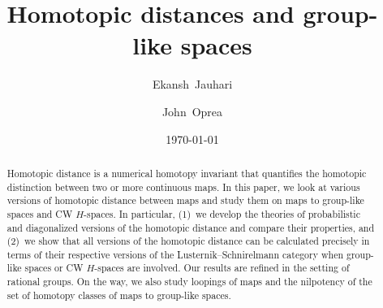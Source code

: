 \documentclass[amscd,amssymb,verbatim,10pt]{amsart}
\date{\today}
\numberwithin{equation}{section}
\theoremstyle{plain}
\theoremstyle{definition}
\begin{document}
\begin{abstract}
Homotopic distance is a numerical homotopy invariant that quantifies the homotopic distinction between two or more continuous maps. In this paper, we look at various versions of homotopic distance between maps and study them on maps to group-like spaces and CW $H$-spaces. In particular, (1)~we develop the theories of probabilistic and diagonalized versions of the homotopic distance and compare their properties, and (2)~we show that all versions of the homotopic distance can be calculated precisely in terms of their respective versions of the Lusternik--Schnirelmann category when group-like spaces or CW $H$-spaces are involved. Our results are refined in the setting of rational groups. On the way, we also study loopings of maps and the nilpotency of the set of homotopy classes of maps to group-like spaces.
\end{abstract}

\title[Homotopic distances and group-like spaces]{Homotopic distances and group-like spaces}



\author[E.~Jauhari]{Ekansh~Jauhari}

\author[J.~Oprea]{John~Oprea}

\address{Ekansh Jauhari, Department of Mathematics, University of Florida, 358 Little Hall, Gainesville, FL 32611, USA.}


\address{John Oprea, Department of Mathematics, Cleveland State University, Cleveland, OH 44115, USA.}






\maketitle
\tableofcontents
\end{document}
